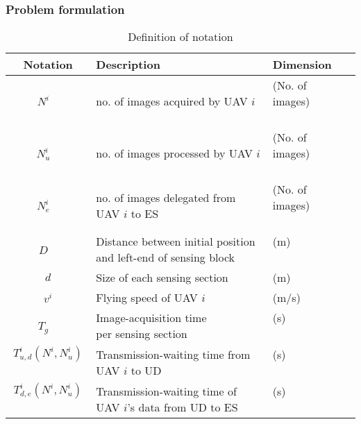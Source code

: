 \documentclass{ieeeaccess}
\begin{document}
\subsubsection{Problem formulation}

\begin{table}[t]
\centering
\caption{Definition of notation}
  \begin{tabular}{|c|p{3.5cm}|l|c|} \hline
Notation & Description & Dimension \\ \hline
 \shortstack[l]{$N^i$\\ ~} &  \shortstack[l]{no. of images acquired\\ by UAV $i$} &  \shortstack[l]{(No. of images)\\ ~} \\ \hline
  \shortstack[l]{$N_u^i$\\ ~} & \shortstack[l]{no. of images processed\\ by UAV $i$} &  \shortstack[l]{(No. of images)\\ ~} \\ \hline
  \shortstack[l]{$N_e^i$\\ ~} & \shortstack[l]{no. of images delegated\\ from UAV $i$ to ES} &  \shortstack[l]{(No. of images)\\ ~}  \\ \hline
 \shortstack[l]{$D$\\ ~}& \shortstack[l]{Distance between initial position\\ and left-end of sensing block }&  \shortstack[l]{(m)\\ ~}  \\ \hline
 $d$ & Size of each sensing section & (m) \\ \hline
  $v^{i}$ & Flying speed of UAV $i$  & (m/s) \\ \hline
  \shortstack[l]{$T_g$\\ ~} & \shortstack[l]{Image-acquisition time\\ per sensing section} &  \shortstack[l]{(s)\\ ~}  \\ \hline
 \shortstack[l]{$T_{u,d}^{i}(N^i,N_u^i)$\\ ~} & \shortstack[l]{Transmission-waiting time\\ from UAV $i$ to UD} &  \shortstack[l]{(s)\\ ~}    \\ \hline
 \shortstack[l]{$T_{d,e}^{i}(N^i,N_u^i)$\\ ~} & \shortstack[l]{Transmission-waiting time\\ of UAV $i$'s data from UD to ES}  &  \shortstack[l]{(s)\\ ~}   \\ \hline

\end{tabular}
\end{table}
\end{document}
